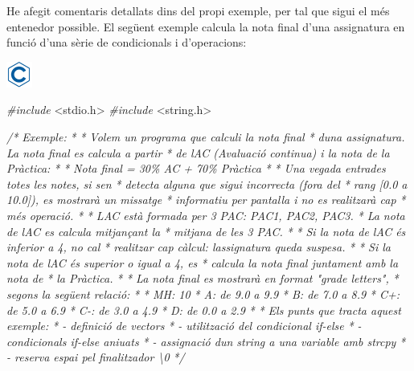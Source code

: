 \documentclass[
]{book}
\newenvironment{Shaded}{\begin{snugshade}}{\end{snugshade}}
\newcommand{\CommentTok}[1]{\textcolor[rgb]{0.56,0.35,0.01}{\textit{#1}}}
\newcommand{\ImportTok}[1]{#1}
\newcommand{\PreprocessorTok}[1]{\textcolor[rgb]{0.56,0.35,0.01}{\textit{#1}}}
\begin{document}
He afegit comentaris detallats dins del propi exemple, per tal que sigui el més entenedor possible. El següent exemple calcula la nota final d'una assignatura en funció d'una sèrie de condicionals i d'operacions:

\includegraphics{./img/c.png}

\begin{Shaded}
\begin{Highlighting}[]
\PreprocessorTok{\#include }\ImportTok{\textless{}stdio.h\textgreater{}}
\PreprocessorTok{\#include }\ImportTok{\textless{}string.h\textgreater{}}

\CommentTok{/* Exemple:}
\CommentTok{ *}
\CommentTok{ * Volem un programa que calculi la nota final}
\CommentTok{ * d\textquotesingle{}una assignatura. La nota final es calcula a partir}
\CommentTok{ * de l\textquotesingle{}AC (Avaluació continua) i la nota de la Pràctica:}
\CommentTok{ *}
\CommentTok{ * Nota final = 30\% AC + 70\% Pràctica}
\CommentTok{ *}
\CommentTok{ * Una vegada entrades totes les notes, si se\textquotesingle{}n}
\CommentTok{ * detecta alguna que sigui incorrecta (fora del}
\CommentTok{ * rang [0.0 a 10.0]), es mostrarà un missatge}
\CommentTok{ * informatiu per pantalla i no es realitzarà cap }
\CommentTok{ * més operació.}
\CommentTok{ *}
\CommentTok{ * L\textquotesingle{}AC està formada per 3 PAC: PAC1, PAC2, PAC3. }
\CommentTok{ * La nota de l\textquotesingle{}AC es calcula mitjançant la }
\CommentTok{ * mitjana de les 3 PAC.}
\CommentTok{ *}
\CommentTok{ * Si la nota de l\textquotesingle{}AC és inferior a 4, no cal }
\CommentTok{ * realitzar cap càlcul: l\textquotesingle{}assignatura queda suspesa.}
\CommentTok{ *}
\CommentTok{ * Si la nota de l\textquotesingle{}AC és superior o igual a 4, es }
\CommentTok{ * calcula la nota final juntament amb la nota de }
\CommentTok{ * la Pràctica.}
\CommentTok{ * }
\CommentTok{ * La nota final es mostrarà en format "grade letters", }
\CommentTok{ * segons la següent relació:}
\CommentTok{ *}
\CommentTok{ * MH: 10}
\CommentTok{ * A: de 9.0 a 9.9}
\CommentTok{ * B: de 7.0 a 8.9}
\CommentTok{ * C+: de 5.0 a 6.9 }
\CommentTok{ * C{-}: de 3.0 a 4.9 }
\CommentTok{ * D: de 0.0 a 2.9}
\CommentTok{ *}
\CommentTok{ * Els punts que tracta aquest exemple:}
\CommentTok{ * {-} definició de vectors}
\CommentTok{ * {-} utilització del condicional if{-}else}
\CommentTok{ * {-} condicionals if{-}else aniuats}
\CommentTok{ * {-} assignació d\textquotesingle{}un string a una variable amb strcpy}
\CommentTok{ * {-} reserva espai pel finalitzador \textquotesingle{}\textbackslash{}0\textquotesingle{}}
\CommentTok{ */}


\end{Highlighting}
\end{Shaded}
\end{document}

